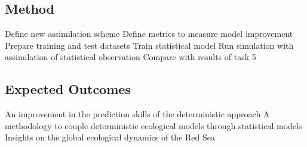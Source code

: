 \subsection{Method}

Define new assimilation scheme
Define metrics to measure model improvement
Prepare training and test datasets
Train statistical model
Run simulation with assimilation of statistical observation
Compare with results of task 5

\subsection{Expected Outcomes}

An improvement in the prediction skills of the deterministic approach
A methodology to couple deterministic ecological models through statistical models
Insights on the global ecological dynamics of the Red Sea


